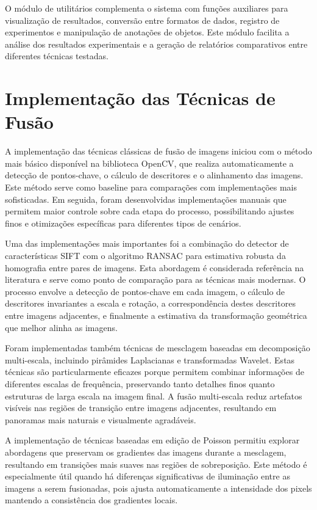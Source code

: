 O módulo de utilitários complementa o sistema com funções auxiliares para visualização de resultados, conversão entre formatos de dados, registro de experimentos e manipulação de anotações de objetos. Este módulo facilita a análise dos resultados experimentais e a geração de relatórios comparativos entre diferentes técnicas testadas.

\section{Implementação das Técnicas de Fusão}

A implementação das técnicas clássicas de fusão de imagens iniciou com o método mais básico disponível na biblioteca OpenCV, que realiza automaticamente a detecção de pontos-chave, o cálculo de descritores e o alinhamento das imagens. Este método serve como baseline para comparações com implementações mais sofisticadas. Em seguida, foram desenvolvidas implementações manuais que permitem maior controle sobre cada etapa do processo, possibilitando ajustes finos e otimizações específicas para diferentes tipos de cenários.

Uma das implementações mais importantes foi a combinação do detector de características SIFT com o algoritmo RANSAC para estimativa robusta da homografia entre pares de imagens. Esta abordagem é considerada referência na literatura e serve como ponto de comparação para as técnicas mais modernas. O processo envolve a detecção de pontos-chave em cada imagem, o cálculo de descritores invariantes a escala e rotação, a correspondência destes descritores entre imagens adjacentes, e finalmente a estimativa da transformação geométrica que melhor alinha as imagens.

Foram implementadas também técnicas de mesclagem baseadas em decomposição multi-escala, incluindo pirâmides Laplacianas e transformadas Wavelet. Estas técnicas são particularmente eficazes porque permitem combinar informações de diferentes escalas de frequência, preservando tanto detalhes finos quanto estruturas de larga escala na imagem final. A fusão multi-escala reduz artefatos visíveis nas regiões de transição entre imagens adjacentes, resultando em panoramas mais naturais e visualmente agradáveis.

A implementação de técnicas baseadas em edição de Poisson permitiu explorar abordagens que preservam os gradientes das imagens durante a mesclagem, resultando em transições mais suaves nas regiões de sobreposição. Este método é especialmente útil quando há diferenças significativas de iluminação entre as imagens a serem fusionadas, pois ajusta automaticamente a intensidade dos pixels mantendo a consistência dos gradientes locais.


